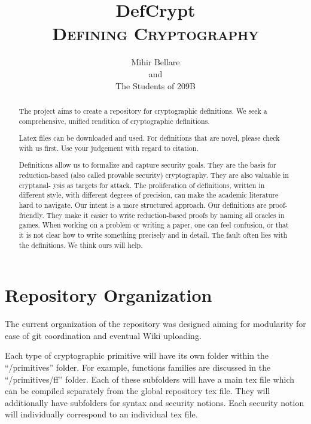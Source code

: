 \documentclass[11pt,twoside]{report}
\title{\Huge DefCrypt \\ \large\textsc{Defining Cryptography}}
\author{Mihir Bellare\\ and\\ The Students of 209B}
\begin{document}
\maketitle




\newpage
\begin{abstract}
The project aims to create a repository for cryptographic definitions.
We seek a comprehensive, unified rendition of cryptographic definitions.

Latex files can be downloaded and used. For definitions that are novel, please check with us first. Use your judgement with regard to citation.

 Definitions allow us to formalize and capture security goals. They are the basis for reduction-based (also called provable security) cryptography. They are also valuable in cryptanal- ysis as targets for attack.
The proliferation of definitions, written in different style, with different degrees of precision, can make the academic literature hard to navigate. Our intent is a more structured approach.
Our definitions are proof-friendly. They make it easier to write reduction-based proofs by naming all oracles in games.
When working on a problem or writing a paper, one can feel confusion, or that it is not clear how to write something precisely and in detail. The fault often lies with the definitions. We think ours will help.
\end{abstract}

\newpage
\tableofcontents
\newpage


\chapter{Repository Organization}\label{sec-one}\label{ap-one}\label{th-one}\label{def-one}\label{cor-one}\label{lem-one}\label{cl-one}\label{prop-one}\label{fig-one}\label{eq-one}
%
The current organization of the repository was designed aiming for modularity for ease of git coordination and eventual Wiki uploading.

Each type of cryptographic primitive will have its own folder within the ``/primitives'' folder. For example, functions families are discussed in the ``/primitives/ff'' folder.
Each of these subfolders will have a main tex file which can be compiled separately from the global repository tex file.
They will additionally have subfolders for syntax and security notions.
Each security notion will individually correspond to an individual tex file.
\end{document}

